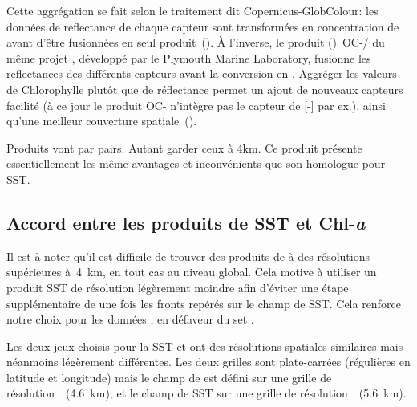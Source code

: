\begin{note}[label={note:merge-chl-or-rrs}]
  Cette aggrégation se fait selon le traitement dit Copernicus-GlobColour: les données de reflectance de chaque capteur sont transformées en concentration de  avant d'être fusionnées en seul produit~(\cite{garnesson_2019}).
  À l'inverse, le produit ()~OC-/ du même projet , développé par le Plymouth Marine Laboratory, fusionne les reflectances des différents capteurs avant la conversion en .
  Aggréger les valeurs de Chlorophylle plutôt que de réflectance permet  un ajout de nouveaux capteurs facilité (à ce jour le produit OC- n'intègre pas le capteur de [-] par ex.), ainsi qu'une meilleur couverture spatiale~(\cite{garnesson_2019}).
\end{note}

Produits vont par pairs.
Autant garder ceux à 4km.
Ce produit présente essentiellement les même avantages et inconvénients que son homologue pour SST.

\begin{figure}
  \centering
  \label{fig:comparaison-chl}
\end{figure}

\subsection{Accord entre les produits de SST et Chl-\textit{a}}

Il est à noter qu'il est difficile de trouver des produits de  à des résolutions supérieures à~\qty{4}{\km}, en tout cas au niveau global.
Cela motive à utiliser un produit SST de résolution légèrement moindre afin d'éviter une étape supplémentaire de  une fois les fronts repérés sur le champ de SST.
Cela renforce notre choix pour les données , en défaveur du set .

Les deux jeux choisis pour la SST et  ont des résolutions spatiales similaires mais néanmoins légèrement différentes.
Les deux grilles sont plate-carrées (régulières en latitude et longitude) mais le champ de  est défini sur une grille  de résolution~~(\tapprox\qty{4.6}{\km}); et le champ de SST sur une grille  de résolution~~(\tapprox\qty{5.6}{\km}).

